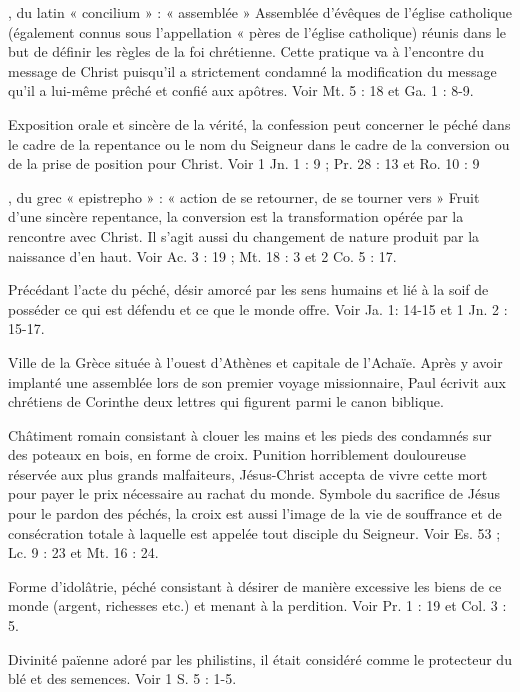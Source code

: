 \begin{multicols}{2}
, du latin « concilium » : « assemblée »
Assemblée d'évêques de l'église catholique (également connus sous l’appellation « pères de l’église catholique) réunis dans le but de définir les règles de la foi chrétienne. Cette pratique va à l’encontre du message de Christ puisqu’il a strictement condamné la modification du message qu’il a lui-même prêché et confié aux apôtres. Voir Mt. 5 : 18 et Ga. 1 : 8-9.

Exposition orale et sincère de la vérité, la confession peut concerner le péché dans le cadre de la repentance ou le nom du Seigneur dans le cadre de la conversion ou de la prise de position pour Christ. Voir 1 Jn. 1 : 9 ; Pr. 28 : 13 et Ro. 10 : 9

, du grec « epistrepho » : « action de se retourner, de se tourner vers »
Fruit d’une sincère repentance, la conversion est la transformation opérée par la rencontre avec Christ. Il s’agit aussi du changement de nature produit par la naissance d’en haut. Voir Ac. 3 : 19 ; Mt. 18 : 3 et 2 Co. 5 : 17.

Précédant l’acte du péché, désir amorcé par les sens humains et lié à la soif de posséder ce qui est défendu et ce que le monde offre. Voir Ja. 1: 14-15 et 1 Jn. 2 : 15-17.

Ville de la Grèce située à l'ouest d'Athènes et capitale de l'Achaïe. Après y avoir implanté une assemblée lors de son premier voyage missionnaire, Paul écrivit aux chrétiens de Corinthe deux lettres qui figurent parmi le canon biblique.

Châtiment romain consistant à clouer les mains et les pieds des condamnés sur des poteaux en bois, en forme de croix. Punition horriblement douloureuse réservée aux plus grands malfaiteurs, Jésus-Christ accepta de vivre cette mort pour payer le prix nécessaire au rachat du monde. Symbole du sacrifice de Jésus pour le pardon des péchés, la croix est aussi l'image de la vie de souffrance et de consécration totale à laquelle est appelée tout disciple du Seigneur. Voir Es. 53 ; Lc. 9 : 23 et Mt. 16 : 24.

Forme d’idolâtrie, péché consistant à désirer de manière excessive les biens de ce monde (argent, richesses etc.) et menant à la perdition. Voir Pr. 1 : 19 et Col. 3 : 5.

Divinité païenne adoré par les philistins, il était considéré comme le protecteur du blé et des semences. Voir 1 S. 5 : 1-5.


\end{multicols}

